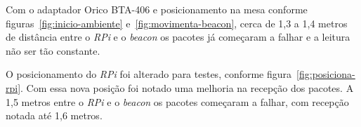 \documentclass[
	12pt,				%
	openright,			%
	oneside,			%
	a4paper,			%
	chapter=TITLE,		%
	english,			%
	brazil				%
	]{abntex2}
\begin{document}
{\begin{figure}[h!]
\end{figure}

Com o adaptador Orico BTA-406 e posicionamento na mesa conforme figuras~\ref{fig:inicio-ambiente} e~\ref{fig:movimenta-beacon}, cerca de 1,3 a 1,4 metros de distância entre o \textit{RPi} e o \textit{beacon} os pacotes já começaram a falhar e a leitura não ser tão constante.

O posicionamento do \textit{RPi} foi alterado para testes, conforme figura~\ref{fig:posiciona-rpi}. Com essa nova posição foi notado uma melhoria na recepção dos pacotes. A 1,5 metros entre o \textit{RPi} e o \textit{beacon} os pacotes começaram a falhar, com recepção notada até 1,6 metros.

\begin{figure}[h!]
\end{figure}

}
\end{document}
